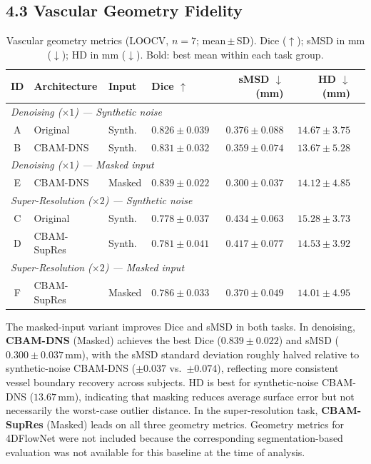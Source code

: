 \documentclass[11pt]{article}
\begin{document}
\subsection*{4.3 Vascular Geometry Fidelity}

\begin{table}[!htbp]
  \centering
  \caption{Vascular geometry metrics (LOOCV, $n=7$; mean\,$\pm$\,SD). Dice ($\uparrow$);
  sMSD in mm ($\downarrow$); HD in mm ($\downarrow$). Bold: best mean within each task group.}
  \label{tab:geometry}
  \setlength{\tabcolsep}{4.5pt}
  \small
  \begin{tabular}{clll rrr}
    \toprule
    ID & Architecture & Input & Dice $\uparrow$ & sMSD $\downarrow$ (mm) & HD $\downarrow$ (mm) \\
    \midrule
    \multicolumn{6}{l}{\textit{Denoising ($\times 1$) --- Synthetic noise}} \\
    \midrule
    A & Original  & Synth. & $0.826 \pm 0.039$ & $0.376 \pm 0.088$ & $14.67 \pm 3.75$ \\
    B & CBAM-DNS  & Synth. & $0.831 \pm 0.032$ & $0.359 \pm 0.074$ & $\mathbf{13.67 \pm 5.28}$ \\
    \multicolumn{6}{l}{\textit{Denoising ($\times 1$) --- Masked input}} \\
    \midrule
    E & CBAM-DNS  & Masked & $\mathbf{0.839 \pm 0.022}$ & $\mathbf{0.300 \pm 0.037}$ & $14.12 \pm 4.85$ \\
    \midrule
    \multicolumn{6}{l}{\textit{Super-Resolution ($\times 2$) --- Synthetic noise}} \\
    \midrule
    C & Original    & Synth. & $0.778 \pm 0.037$ & $0.434 \pm 0.063$ & $15.28 \pm 3.73$ \\
    D & CBAM-SupRes & Synth. & $0.781 \pm 0.041$ & $0.417 \pm 0.077$ & $14.53 \pm 3.92$ \\
    \multicolumn{6}{l}{\textit{Super-Resolution ($\times 2$) --- Masked input}} \\
    \midrule
    F & CBAM-SupRes & Masked & $\mathbf{0.786 \pm 0.033}$ & $\mathbf{0.370 \pm 0.049}$ & $\mathbf{14.01 \pm 4.95}$ \\
    \bottomrule
  \end{tabular}
\end{table}

The masked-input variant improves Dice and sMSD in both tasks. In denoising, \textbf{CBAM-DNS}
(Masked) achieves the best Dice ($0.839 \pm 0.022$) and sMSD ($0.300 \pm 0.037$\,mm), with
the sMSD standard deviation roughly halved relative to synthetic-noise CBAM-DNS ($\pm 0.037$
vs.\ $\pm 0.074$), reflecting more consistent vessel boundary recovery across subjects.
HD is best for synthetic-noise CBAM-DNS ($13.67$\,mm), indicating that masking reduces
average surface error but not necessarily the worst-case outlier distance. In the
super-resolution task, \textbf{CBAM-SupRes} (Masked) leads on all three geometry metrics.
Geometry metrics for 4DFlowNet were not included because the corresponding segmentation-based
evaluation was not available for this baseline at the time of analysis.
\end{document}
